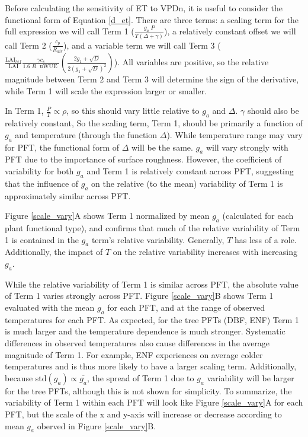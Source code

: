 \documentclass[draft,linenumbers]{agujournal}
\begin{document}
Before calculating the sensitivity of ET to VPDn, it is useful to consider the functional form of Equation \ref{d_et}. There are three terms: a scaling term for the full expression we will call Term 1 ($\frac{g_a \; P}{T(\Delta + \gamma)}$), a relatively constant offset we will call Term 2 ($\frac{c_p}{R_{air}}$), and a variable term we will call Term 3 ($\frac{\text{LAI$_{ref}$}}{\text{LAI}}\frac{\gamma c_s }{1.6 \; R\; \text{ uWUE }} \left( \frac{2 g_1 + \sqrt{D}}{2 (g_1 + \sqrt{D})^2}\right)$). All variables are positive, so the relative magnitude between Term 2 and Term 3 will determine the sign of the derivative, while Term 1 will scale the expression larger or smaller.

In Term 1, $\frac{P}{T} \propto \rho$, so this should vary little relative to $g_a$ and $\Delta$.  $\gamma$ should also be relatively constant, So the scaling term, Term 1, should be primarily a function of $g_a$ and temperature (through the function $\Delta$). While temperature range may vary for PFT, the functional form of $\Delta$ will be the same. $g_a$ will vary strongly with PFT due to the importance of surface roughness. However, the coefficient of variability for both $g_a$ and Term 1 is relatively constant across PFT, suggesting that the influence of $g_a$ on the relative (to the mean) variability of Term 1 is approximately similar across PFT.

Figure \ref{scale_vary}A shows Term 1 normalized by mean $g_a$ (calculated for each plant functional type), and confirms that much of the relative variability of Term 1 is contained in the $g_a$ term's relative variability. Generally, $T$ has less of a role. Additionally, the impact of $T$ on the relative variability increases with increasing $g_a$. %


While the relative variability of Term 1 is similar across PFT, the absolute value of Term 1 varies strongly across PFT. Figure \ref{scale_vary}B shows Term 1 evaluated with the mean $g_a$ for each PFT, and at the range of observed temperatures for each PFT. As expected, for the tree PFTs (DBF, ENF) Term 1 is much larger and the temperature dependence is much stronger. Systematic differences in observed temperatures also cause differences in the average magnitude of Term 1. For example, ENF experiences on average colder temperatures and is thus more likely to have a larger scaling term. Additionally, because std$(g_a) \propto \overline{g_a}$, the spread of Term 1 due to $g_a$ variability will be larger for the tree PFTs, although this is not shown for simplicity. To summarize, the variability of Term 1 within each PFT will look like Figure \ref{scale_vary}A for each PFT, but the scale of the x and y-axis will increase or decrease according to mean $g_a$ oberved in Figure \ref{scale_vary}B.
 
\end{document}
